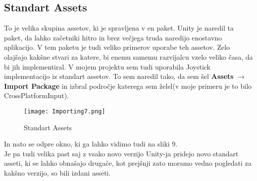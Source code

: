 {\color{indiagreen}\subsection{Standart Assets}}
To je velika skupina assetov, ki je spravljena v en paket. Unity je naredil ta paket, da lahko začetniki hitro in brez večjega truda naredijo enostavno aplikacijo. V tem paketu je tudi veliko primerov uporabe teh assetov. Zelo olajšajo kakšne stvari za katere, bi enemu samemu razvijalcu vzelo veliko časa, da bi jih implementiral. V mojem projektu sem tudi uporabila Joystick implementacijo iz standart assetov. To sem naredil tako, da sem šel \textbf{Assets} $\rightarrow$ \textbf{Import Package} in izbral področje katerega sem želel(v moje primeru je to bilo CrossPlatformInput).\\
\begin{figure}[ht!]
	\centering
	\texttt{[image: Importing7.png]}
	\caption{Standart Assets}
\end{figure}
In nato se odpre okno, ki ga lahko vidimo tudi na sliki 9.\\
Je pa tudi velika past saj z vsako novo verzijo Unity-ja pridejo novo standart asseti, ki se lahko obnašajo drugače, kot prejšnji zato moramo vedno pogledati za kakšno verzijo, so bili izdani asseti.